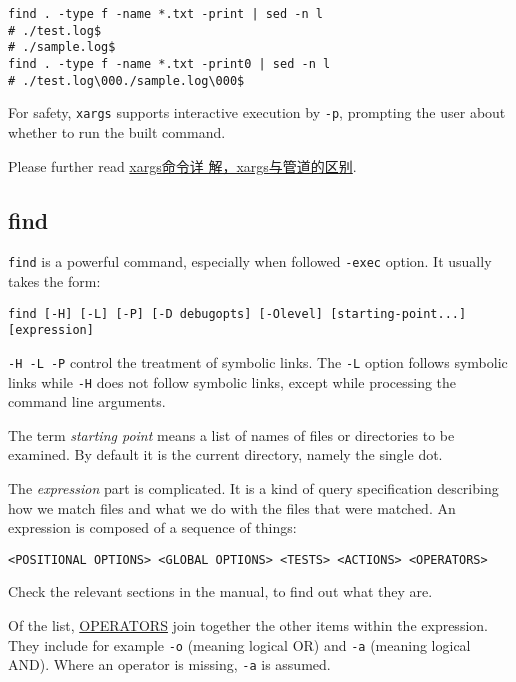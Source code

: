 \begin{lstlisting}
find . -type f -name *.txt -print | sed -n l
# ./test.log$
# ./sample.log$
find . -type f -name *.txt -print0 | sed -n l
# ./test.log\000./sample.log\000$
\end{lstlisting}

For safety, \lstinline|xargs| supports interactive execution by
\lstinline|-p|, prompting the user about whether to run the built
command.

Please further read
\href{https://www.cnblogs.com/wangqiguo/p/6464234.html}{xargs命令详
  解，xargs与管道的区别}.

\subsection{find}
\label{sec:bash-find}

\lstinline|find| is a powerful command, especially when followed
\lstinline|-exec| option. It usually takes the form:

\begin{lstlisting}
find [-H] [-L] [-P] [-D debugopts] [-Olevel] [starting-point...] [expression]
\end{lstlisting}

\lstinline|-H -L -P| control the treatment of symbolic links. The
\lstinline|-L| option follows symbolic links while \lstinline|-H|
does not follow symbolic links, except while processing the
command line arguments.

The term \textit{starting point} means a list of names of files or
directories to be examined. By default it is the current
directory, namely the single dot.

The \textit{expression} part is complicated. It is a kind of query
specification describing how we match files and what we do with
the files that were matched. An expression is composed of a
sequence of things:

\begin{lstlisting}
<POSITIONAL OPTIONS> <GLOBAL OPTIONS> <TESTS> <ACTIONS> <OPERATORS>
\end{lstlisting}

Check the relevant sections in the manual, to find out what they
are.

Of the list, \uline{OPERATORS} join together the other items
within the expression. They include for example \lstinline|-o|
(meaning logical OR) and \lstinline|-a| (meaning logical
AND). Where an operator is missing, \lstinline|-a| is assumed.

